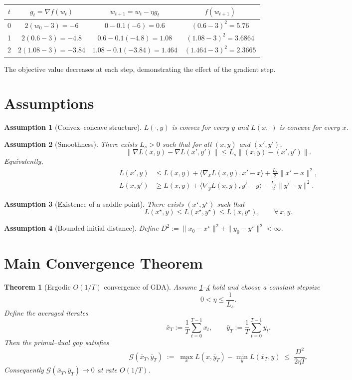 \documentclass[11pt]{article}
\newtheorem{theorem}{Theorem}
\newtheorem{assumption}{Assumption}
\newcommand{\gap}{\mathcal{G}}
\begin{document}
\begin{center}
\begin{tabular}{c|c|c|c}
$t$ & $g_{t}=\nabla f(w_{t})$ & $w_{t+1}=w_{t}-\eta g_{t}$ & $f(w_{t+1})$\\ \hline
0 & $2(w_{0}-3) = -6$ & $0-0.1(-6)=0.6$ & $(0.6-3)^{2}=5.76$\\
1 & $2(0.6-3) = -4.8$ & $0.6-0.1(-4.8)=1.08$ & $(1.08-3)^{2}=3.6864$\\
2 & $2(1.08-3) = -3.84$ & $1.08-0.1(-3.84)=1.464$ & $(1.464-3)^{2}=2.3665$\\
\end{tabular}
\end{center}
The objective value decreases at each step, demonstrating the effect of the gradient step.

\newpage

\section*{Assumptions}
\begin{assumption}[Convex–concave structure]\label{ass:convconc}
$L(\cdot,y)$ is convex for every $y$ and $L(x,\cdot)$ is concave for every $x$.
\end{assumption}
\begin{assumption}[Smoothness]\label{ass:smooth}
There exists $L_{s}>0$ such that for all $(x,y)$ and $(x',y')$,
\[
\|\nabla L(x,y)-\nabla L(x',y')\|\le L_{s}\|(x,y)-(x',y')\|.
\]
Equivalently,
\begin{align}
L(x',y) &\le L(x,y)+\langle \nabla_{x}L(x,y),x'-x\rangle +\frac{L_{s}}{2}\|x'-x\|^{2},\label{eq:smooth-x}\\
L(x,y') &\ge L(x,y)+\langle \nabla_{y}L(x,y),y'-y\rangle -\frac{L_{s}}{2}\|y'-y\|^{2}.\label{eq:smooth-y}
\end{align}
\end{assumption}
\begin{assumption}[Existence of a saddle point]\label{ass:saddle}
There exists $(x^{\star},y^{\star})$ such that
\[
L(x^{\star},y)\le L(x^{\star},y^{\star})\le L(x,y^{\star}),\qquad \forall\,x,y.
\]
\end{assumption}
\begin{assumption}[Bounded initial distance]\label{ass:bounded}
Define $D^{2}:=\|x_{0}-x^{\star}\|^{2}+\|y_{0}-y^{\star}\|^{2}<\infty$.
\end{assumption}

\section*{Main Convergence Theorem}
\begin{theorem}[Ergodic $O(1/T)$ convergence of GDA]\label{thm:main}
Assume \ref{ass:convconc}–\ref{ass:bounded} hold and choose a constant stepsize
\[
0<\eta\le \frac{1}{L_{s}}.
\]
Define the averaged iterates
\[
\bar{x}_{T}:=\frac{1}{T}\sum_{t=0}^{T-1}x_{t},\qquad 
\bar{y}_{T}:=\frac{1}{T}\sum_{t=0}^{T-1}y_{t}.
\]
Then the primal–dual gap satisfies
\[
\gap(\bar{x}_{T},\bar{y}_{T})\;:=\;\max_{x}L(x,\bar{y}_{T})-\min_{y}L(\bar{x}_{T},y)
\;\le\; \frac{D^{2}}{2\eta T}.
\]
Consequently $\gap(\bar{x}_{T},\bar{y}_{T})\to0$ at rate $O(1/T)$.
\end{theorem}
\end{document}
